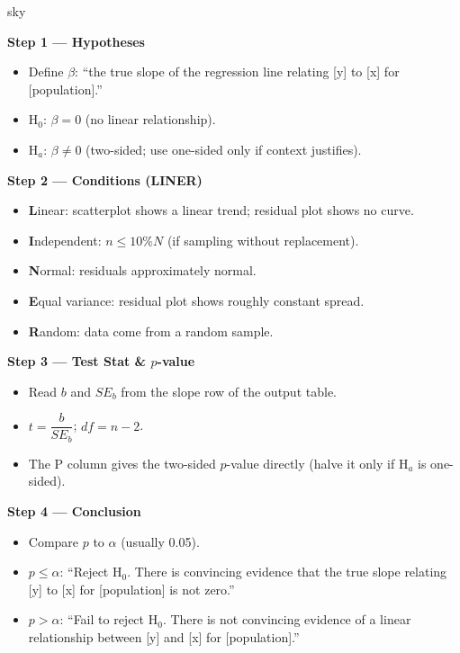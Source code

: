 \documentclass[10pt]{article}
\begin{document}
\begin{skillbox}{sky}
\begin{minipage}[t]{0.48\linewidth}
    \textbf{Step 1 --- Hypotheses}
    \begin{itemize}
        \item Define $\beta$: ``the true slope of the regression line relating
              [y] to [x] for [population].''
        \item H$_0$: $\beta = 0$ (no linear relationship).
        \item H$_a$: $\beta \ne 0$ (two-sided; use one-sided only if context justifies).
    \end{itemize}
    \textbf{Step 2 --- Conditions (LINER)}
    \begin{itemize}
        \item \textbf{L}inear: scatterplot shows a linear trend; residual plot shows no curve.
        \item \textbf{I}ndependent: $n \le 10\%N$ (if sampling without replacement).
        \item \textbf{N}ormal: residuals approximately normal.
        \item \textbf{E}qual variance: residual plot shows roughly constant spread.
        \item \textbf{R}andom: data come from a random sample.
    \end{itemize}
\end{minipage}
\hfill
\begin{minipage}[t]{0.48\linewidth}
    \textbf{Step 3 --- Test Stat \& $p$-value}
    \begin{itemize}
        \item Read $b$ and $SE_b$ from the slope row of the output table.
        \item $t = \dfrac{b}{SE_b}$; $df = n - 2$.
        \item The P column gives the two-sided $p$-value directly (halve it only if
              H$_a$ is one-sided).
    \end{itemize}
    \textbf{Step 4 --- Conclusion}
    \begin{itemize}
        \item Compare $p$ to $\alpha$ (usually 0.05).
        \item $p \le \alpha$: ``Reject H$_0$. There is convincing evidence that the
              true slope relating [y] to [x] for [population] is not zero.''
        \item $p > \alpha$: ``Fail to reject H$_0$. There is not convincing evidence
              of a linear relationship between [y] and [x] for [population].''
    \end{itemize}
\end{minipage}
\end{skillbox}
\end{document}
